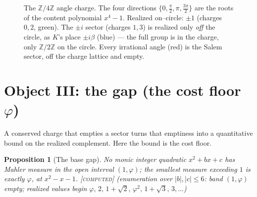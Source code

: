 \documentclass[11pt]{article}
\theoremstyle{plain}
\newtheorem{proposition}[theorem]{Proposition}
\theoremstyle{definition}
\theoremstyle{remark}
\newcommand{\computed}{\textcolor{forcedc}{\textsc{[computed]}}}
\newcommand{\Z}{\mathbb{Z}}
\newcommand{\abs}[1]{\left\lvert #1 \right\rvert}
\begin{document}
\begin{figure}[t]
\centering
{}
\caption{\small The $\Z/4\Z$ angle charge. The four directions $\{0,\tfrac\pi2,\pi,\tfrac{3\pi}2\}$ are the roots of the content polynomial $x^4-1$. Realized on--circle: $\pm1$ (charges $0,2$, \textcolor{growc}{green}). The $\pm i$ sector (charges $1,3$) is realized only \emph{off} the circle, as $K$'s place $\pm i\beta$ (\textcolor{capc}{blue}) --- the full group is in the charge, only $\Z/2\Z$ on the circle. Every irrational angle (\textcolor{openc}{red}) is the Salem sector, off the charge lattice and empty.}
\label{fig:charge}
\end{figure}

\section{Object III: the gap (the cost floor \texorpdfstring{$\varphi$}{phi})}\label{sec:gapIII}

A conserved charge that empties a sector turns that emptiness into a quantitative bound on the realized complement. Here the bound is the cost floor.

\begin{proposition}[The base gap]\label{prop:basegap}
No monic integer quadratic $x^2+bx+c$ has Mahler measure in the open interval $(1,\varphi)$; the smallest measure exceeding $1$ is exactly $\varphi$, at $x^2-x-1$. \computed{} {\small(enumeration over $\abs b,\abs c\le6$: band $(1,\varphi)$ empty; realized values begin $\varphi,\,2,\,1{+}\sqrt2,\,\varphi^2,\,1{+}\sqrt3,\,3,\dots$)}
\end{proposition}
\end{document}
